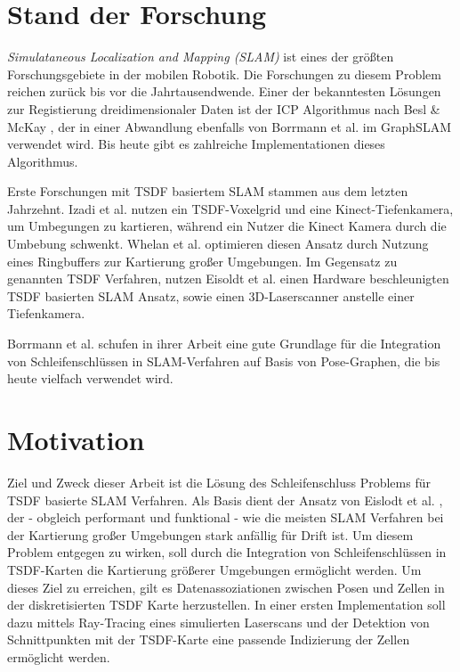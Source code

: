 \section{Stand der Forschung} \label{label:sdf}

\textit{Simulataneous Localization and Mapping (SLAM)} ist eines der größten Forschungsgebiete in der mobilen Robotik.
Die Forschungen zu diesem Problem reichen zurück bis vor die Jahrtausendwende.
Einer der bekanntesten Lösungen zur Registierung dreidimensionaler Daten ist der ICP Algorithmus nach Besl \& McKay \cite{besl1992method}, der in einer Abwandlung ebenfalls von Borrmann et al. im GraphSLAM \cite{borrmann2008globally} verwendet wird.
Bis heute gibt es zahlreiche Implementationen dieses Algorithmus.

Erste Forschungen mit TSDF basiertem SLAM stammen aus dem letzten Jahrzehnt.
Izadi et al. \cite{izadi2011kinectfusion} nutzen ein TSDF-Voxelgrid und eine Kinect-Tiefenkamera, um Umbegungen zu kartieren, während ein Nutzer die Kinect Kamera durch die Umbebung schwenkt.
Whelan et al. \cite{whelan2012kintinuous} optimieren diesen Ansatz durch Nutzung eines Ringbuffers zur Kartierung großer Umgebungen.
Im Gegensatz zu genannten TSDF Verfahren, nutzen Eisoldt et al. \cite{HATSDF} einen Hardware beschleunigten TSDF basierten SLAM Ansatz, sowie einen 3D-Laserscanner anstelle einer Tiefenkamera.

Borrmann et al. \citep{borrmann2008globally} schufen in ihrer Arbeit eine gute Grundlage für die Integration von Schleifenschlüssen in SLAM-Verfahren auf Basis von Pose-Graphen, die bis heute vielfach verwendet wird.


\section{Motivation}

Ziel und Zweck dieser Arbeit ist die Lösung des Schleifenschluss Problems für TSDF basierte SLAM Verfahren.
Als Basis dient der Ansatz von Eislodt et al. \cite{HATSDF}, der - obgleich performant und funktional - wie die meisten SLAM Verfahren bei der Kartierung großer Umgebungen stark anfällig für Drift ist. Um diesem Problem entgegen zu wirken, soll durch die Integration von Schleifenschlüssen in TSDF-Karten die Kartierung größerer Umgebungen ermöglicht werden.
Um dieses Ziel zu erreichen, gilt es Datenassoziationen zwischen Posen und Zellen in der diskretisierten TSDF Karte herzustellen.
In einer ersten Implementation soll dazu mittels Ray-Tracing eines simulierten Laserscans und der Detektion von Schnittpunkten mit der TSDF-Karte eine passende Indizierung der Zellen ermöglicht werden.


